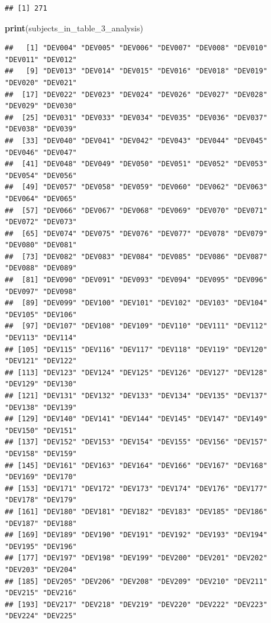 \documentclass[
]{article}
\newenvironment{Shaded}{\begin{snugshade}}{\end{snugshade}}
\newcommand{\DecValTok}[1]{\textcolor[rgb]{0.00,0.00,0.81}{#1}}
\newcommand{\KeywordTok}[1]{\textcolor[rgb]{0.13,0.29,0.53}{\textbf{#1}}}
\newcommand{\NormalTok}[1]{#1}
\begin{document}
\begin{verbatim}
## [1] 271
\end{verbatim}

\begin{Shaded}
\begin{Highlighting}[]
\KeywordTok{print}\NormalTok{(subjects_in_table_}\DecValTok{3}\NormalTok{_analysis)}
\end{Highlighting}
\end{Shaded}

\begin{verbatim}
##   [1] "DEV004" "DEV005" "DEV006" "DEV007" "DEV008" "DEV010" "DEV011" "DEV012"
##   [9] "DEV013" "DEV014" "DEV015" "DEV016" "DEV018" "DEV019" "DEV020" "DEV021"
##  [17] "DEV022" "DEV023" "DEV024" "DEV026" "DEV027" "DEV028" "DEV029" "DEV030"
##  [25] "DEV031" "DEV033" "DEV034" "DEV035" "DEV036" "DEV037" "DEV038" "DEV039"
##  [33] "DEV040" "DEV041" "DEV042" "DEV043" "DEV044" "DEV045" "DEV046" "DEV047"
##  [41] "DEV048" "DEV049" "DEV050" "DEV051" "DEV052" "DEV053" "DEV054" "DEV056"
##  [49] "DEV057" "DEV058" "DEV059" "DEV060" "DEV062" "DEV063" "DEV064" "DEV065"
##  [57] "DEV066" "DEV067" "DEV068" "DEV069" "DEV070" "DEV071" "DEV072" "DEV073"
##  [65] "DEV074" "DEV075" "DEV076" "DEV077" "DEV078" "DEV079" "DEV080" "DEV081"
##  [73] "DEV082" "DEV083" "DEV084" "DEV085" "DEV086" "DEV087" "DEV088" "DEV089"
##  [81] "DEV090" "DEV091" "DEV093" "DEV094" "DEV095" "DEV096" "DEV097" "DEV098"
##  [89] "DEV099" "DEV100" "DEV101" "DEV102" "DEV103" "DEV104" "DEV105" "DEV106"
##  [97] "DEV107" "DEV108" "DEV109" "DEV110" "DEV111" "DEV112" "DEV113" "DEV114"
## [105] "DEV115" "DEV116" "DEV117" "DEV118" "DEV119" "DEV120" "DEV121" "DEV122"
## [113] "DEV123" "DEV124" "DEV125" "DEV126" "DEV127" "DEV128" "DEV129" "DEV130"
## [121] "DEV131" "DEV132" "DEV133" "DEV134" "DEV135" "DEV137" "DEV138" "DEV139"
## [129] "DEV140" "DEV141" "DEV144" "DEV145" "DEV147" "DEV149" "DEV150" "DEV151"
## [137] "DEV152" "DEV153" "DEV154" "DEV155" "DEV156" "DEV157" "DEV158" "DEV159"
## [145] "DEV161" "DEV163" "DEV164" "DEV166" "DEV167" "DEV168" "DEV169" "DEV170"
## [153] "DEV171" "DEV172" "DEV173" "DEV174" "DEV176" "DEV177" "DEV178" "DEV179"
## [161] "DEV180" "DEV181" "DEV182" "DEV183" "DEV185" "DEV186" "DEV187" "DEV188"
## [169] "DEV189" "DEV190" "DEV191" "DEV192" "DEV193" "DEV194" "DEV195" "DEV196"
## [177] "DEV197" "DEV198" "DEV199" "DEV200" "DEV201" "DEV202" "DEV203" "DEV204"
## [185] "DEV205" "DEV206" "DEV208" "DEV209" "DEV210" "DEV211" "DEV215" "DEV216"
## [193] "DEV217" "DEV218" "DEV219" "DEV220" "DEV222" "DEV223" "DEV224" "DEV225"

\end{verbatim}
\end{document}
